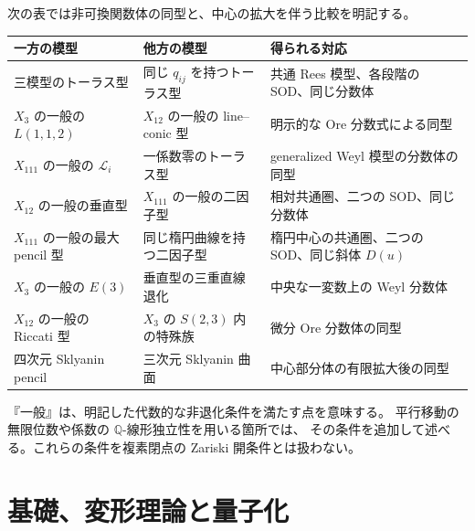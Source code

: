 \documentclass[11pt,a4paper]{ltjsarticle}
\theoremstyle{definition}
\begin{document}
次の表では非可換関数体の同型と、中心の拡大を伴う比較を明記する。
\begin{center}
\small
\begin{tabular}{p{}|p{}|p{}}
一方の模型&他方の模型&得られる対応\\\hline
三模型のトーラス型&同じ $q_{ij}$ を持つトーラス型&共通 Rees 模型、各段階の SOD、同じ分数体\\
$X_3$ の一般の $L(1,1,2)$&$X_{12}$ の一般の line--conic 型&明示的な Ore 分数式による同型\\
$X_{111}$ の一般の $\mathcal L_i$&一係数零のトーラス型&generalized Weyl 模型の分数体の同型\\
$X_{12}$ の一般の垂直型&$X_{111}$ の一般の二因子型&相対共通圏、二つの SOD、同じ分数体\\
$X_{111}$ の一般の最大 pencil 型&同じ楕円曲線を持つ二因子型&楕円中心の共通圏、二つの SOD、同じ斜体 $D(u)$\\
$X_3$ の一般の $E(3)$&垂直型の三重直線退化&中央な一変数上の Weyl 分数体\\
$X_{12}$ の一般の Riccati 型&$X_3$ の $S(2,3)$ 内の特殊族&微分 Ore 分数体の同型\\
四次元 Sklyanin pencil&三次元 Sklyanin 曲面&中心部分体の有限拡大後の同型
\end{tabular}
\end{center}

『一般』は、明記した代数的な非退化条件を満たす点を意味する。
平行移動の無限位数や係数の $\mathbb Q$-線形独立性を用いる箇所では、
その条件を追加して述べる。これらの条件を複素閉点の Zariski 開条件とは扱わない。

\part{基礎、変形理論と量子化}
\end{document}
